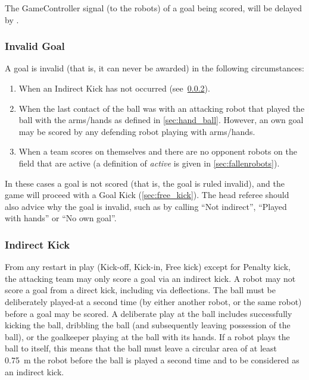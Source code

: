 The GameController signal (to the robots) of a goal being scored, will be delayed by \GoalScoredDelay.

\subsubsection{Invalid Goal}
\label{sec:invalid_goal}

A goal is invalid (that is, it can never be awarded) in the following circumstances:
\begin{enumerate}
    \item When an Indirect Kick has not occurred (see~\cref{sec:indirect_kick}).
    \item When the last contact of the ball was with an attacking robot that played the ball with the arms/hands as defined in \cref{sec:hand_ball}. However, an own goal may be scored by any defending robot playing with arms/hands.
    \item When a team scores on themselves and there are no opponent robots on the field that are active (a definition of \emph{active} is given in \cref{sec:fallenrobots}).
\end{enumerate}

In these cases a goal is not scored (that is, the goal is ruled invalid), and the game will proceed with a Goal Kick (\cf \cref{sec:free_kick}). The head referee should also advice why the goal is invalid, such as by calling ``Not indirect'', ``Played with hands'' or ``No own goal''.

\subsubsection{Indirect Kick}
\label{sec:indirect_kick}

From any restart in play (Kick-off, Kick-in, Free kick) except for Penalty kick, the attacking team may only score a goal via an indirect kick.
A robot may not score a goal from a direct kick, including via deflections.
The ball must be deliberately played-at a second time (by either another robot, or the same robot) before a goal may be scored.
A deliberate play at the ball includes successfully kicking the ball, dribbling the ball (and subsequently leaving possession of the ball), or the goalkeeper playing at the ball with its hands.
If a robot plays the ball to itself, this means that the ball must leave a circular area of at least \qty{0.75}{\metre} the robot before the ball is played a second time and to be considered as an indirect
kick.

